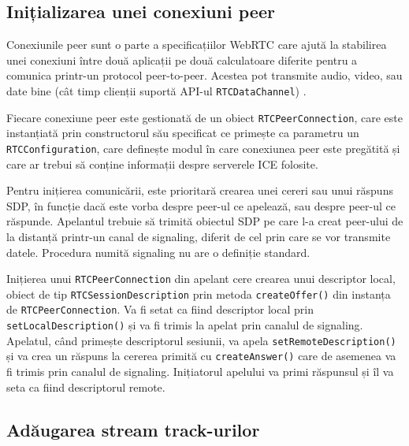 \subsection{Inițializarea unei conexiuni peer}
\label{sec:ch3sec4subsec2}

\indent \par Conexiunile peer sunt o parte a specificațiilor WebRTC care ajută la stabilirea unei conexiuni între două aplicații pe două calculatoare diferite pentru a comunica printr-un protocol peer-to-peer. Acestea pot transmite audio, video, sau date bine (cât timp clienții suportă API-ul \texttt{RTCDataChannel}) \cite{WebPeer2014}.
\indent \par Fiecare conexiune peer este gestionată de un obiect \texttt{RTCPeerConnection}, care este instanțiată prin constructorul său specificat ce primește ca parametru un \texttt{RTCConfiguration}, care definește modul în care conexiunea peer este pregătită și care ar trebui să conține informații despre serverele ICE folosite.
\indent \par Pentru inițierea comunicării, este prioritară crearea unei cereri sau unui răspuns SDP, în funcție dacă este vorba despre peer-ul ce apelează, sau despre peer-ul ce răspunde. Apelantul trebuie să trimită obiectul SDP pe care l-a creat peer-ului de la distanță printr-un canal de signaling, diferit de cel prin care se vor transmite datele. Procedura numită signaling nu are o definiție standard.
\indent \par Inițierea unui \texttt{RTCPeerConnection} din apelant cere crearea unui descriptor local, obiect de tip \texttt{RTCSessionDescription} prin metoda \texttt{createOffer()} din instanța de \texttt{RTCPeerConnection}. Va fi setat ca fiind descriptor local prin \texttt{setLocalDescription()} și va fi trimis la apelat prin canalul de signaling. Apelatul, când primește descriptorul sesiunii, va apela \texttt{setRemoteDescription()} și va crea un răspuns la cererea primită cu \texttt{createAnswer()} care de asemenea va fi trimis prin canalul de signaling. Inițiatorul apelului va primi răspunsul și îl va seta ca fiind descriptorul remote.

\subsection{Adăugarea stream track-urilor}
\label{sec:ch3sec4subsec3}

